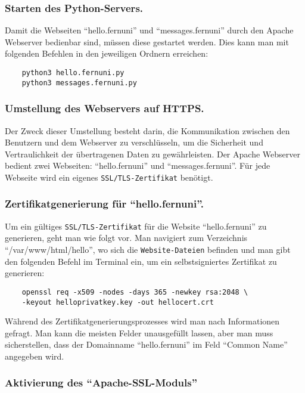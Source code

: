 \subsubsection*{Starten des Python-Servers.}

Damit die Webseiten \enquote{hello.fernuni} und \enquote{messages.fernuni} durch den Apache Webserver bedienbar sind, müssen diese gestartet werden. Dies kann man mit folgenden Befehlen in den jeweiligen Ordnern erreichen:

\begin{verbatim}
    python3 hello.fernuni.py
    python3 messages.fernuni.py
\end{verbatim}

\subsubsection*{Umstellung des Webservers auf HTTPS.}
Der Zweck dieser Umstellung besteht darin, die Kommunikation zwischen den Benutzern und dem Webserver zu verschlüsseln, um die Sicherheit und Vertraulichkeit der übertragenen Daten zu gewährleisten. Der Apache Webserver bedient zwei Webseiten: \enquote{hello.fernuni} und \enquote{messages.fernuni}. Für jede Webseite wird ein eigenes \verb+SSL/TLS-Zertifikat+ benötigt.

\subsubsection*{Zertifikatgenerierung für \enquote{hello.fernuni}.}
Um ein gültiges \verb+SSL/TLS-Zertifikat+ für die Website \enquote{hello.fernuni} zu generieren, geht man wie folgt vor.
Man navigiert zum Verzeichnis \enquote{/var/www/html/hello}, wo sich die \verb+Website-Dateien+ befinden und man gibt den folgenden Befehl im Terminal ein, um ein selbstsigniertes Zertifikat zu generieren:

\begin{verbatim}
    openssl req -x509 -nodes -days 365 -newkey rsa:2048 \
    -keyout helloprivatkey.key -out hellocert.crt
\end{verbatim}

Während des Zertifikatgenerierungsprozesses wird man nach Informationen gefragt. Man kann die meisten Felder unausgefüllt lassen, aber man muss sicherstellen, dass der Domainname \enquote{hello.fernuni} im Feld \enquote{Common Name} angegeben wird.

\subsubsection*{Aktivierung des \enquote{Apache-SSL-Moduls}}

